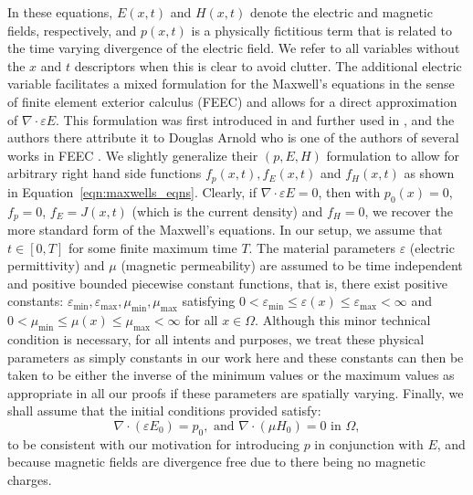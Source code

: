 \documentclass{amsart}
\theoremstyle{thmstyleone}%
\theoremstyle{thmstyletwo}%
\theoremstyle{thmstylethree}%
\begin{document}
In these equations, $E(x, t)$ and $H(x, t)$ denote the electric and magnetic fields, respectively, and $p(x, t)$ is a physically fictitious term that is related to the time varying divergence of the electric field. We refer to all variables without the $x$ and $t$ descriptors when this is clear to avoid clutter. The additional electric variable facilitates a mixed formulation for the Maxwell's equations in the sense of finite element exterior calculus (FEEC) and allows for a direct approximation of $\nabla \cdot \varepsilon E$. This formulation was first introduced in \cite{AdPeZi2013} and further used in \cite{AdHuZi2017, AdCaHuZi2021}, and the authors there attribute it to Douglas Arnold who is one of the authors of several works in FEEC \cite{ArFaWi2010, Arnold2018}. We slightly generalize their $(p, E, H)$ formulation to allow for arbitrary right hand side functions $f_p(x, t), f_E(x, t)$ and $f_H(x, t)$ as shown in Equation~\eqref{eqn:maxwells_eqns}. Clearly, if $\nabla \cdot \varepsilon E = 0$, then with $p_0(x) = 0$, $f_p = 0$, $f_E = J(x, t)$ (which is the current density) and $f_H = 0$, we recover the more standard form of the Maxwell's equations. In our setup, we assume that $t \in [0, T]$ for some finite maximum time $T$. The material parameters $\varepsilon$ (electric permittivity) and $\mu$ (magnetic permeability) are assumed to be time independent and positive bounded piecewise constant functions, that is, there exist positive constants: $\varepsilon_{\min}, \varepsilon_{\max}, \mu_{\min}, \mu_{\max}$ satisfying $0 < \varepsilon_{\min} \le \varepsilon(x) \le \varepsilon_{\max} < \infty$ and $0 < \mu_{\min} \le \mu(x) \le \mu_{\max} < \infty$ for all $x \in \Omega$. Although this minor technical condition is necessary, for all intents and purposes, we treat these physical parameters as simply constants in our work here and these constants can then be taken to be either the inverse of the minimum values or the maximum values as appropriate in all our proofs if these parameters are spatially varying. Finally, we shall assume that the initial conditions provided satisfy:
\[
  \nabla \cdot (\varepsilon E_0) = p_0 , \text{~and~} \nabla \cdot (\mu H_0) = 0 \text{~in~} \Omega,
\]
to be consistent with our motivation for introducing $p$ in conjunction with $E$, and because magnetic fields are divergence free due to there being no magnetic charges.
\end{document}
